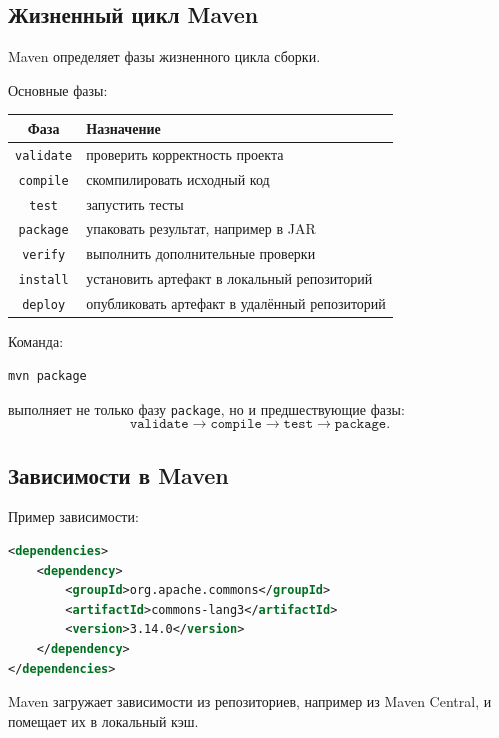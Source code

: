 \documentclass[12pt,a4paper]{article}
\begin{document}
\subsection{Жизненный цикл Maven}

Maven определяет фазы жизненного цикла сборки.

Основные фазы:
\begin{center}
\begin{tabular}{|c|p{9cm}|}
\hline
Фаза & Назначение \\
\hline
\texttt{validate} & проверить корректность проекта \\
\hline
\texttt{compile} & скомпилировать исходный код \\
\hline
\texttt{test} & запустить тесты \\
\hline
\texttt{package} & упаковать результат, например в JAR \\
\hline
\texttt{verify} & выполнить дополнительные проверки \\
\hline
\texttt{install} & установить артефакт в локальный репозиторий \\
\hline
\texttt{deploy} & опубликовать артефакт в удалённый репозиторий \\
\hline
\end{tabular}
\end{center}

Команда:

\begin{lstlisting}
mvn package
\end{lstlisting}

выполняет не только фазу \texttt{package}, но и предшествующие фазы:
\[
\texttt{validate} \rightarrow \texttt{compile} \rightarrow \texttt{test} \rightarrow \texttt{package}.
\]

\subsection{Зависимости в Maven}

Пример зависимости:

\begin{lstlisting}[language=XML]
<dependencies>
    <dependency>
        <groupId>org.apache.commons</groupId>
        <artifactId>commons-lang3</artifactId>
        <version>3.14.0</version>
    </dependency>
</dependencies>
\end{lstlisting}

Maven загружает зависимости из репозиториев, например из Maven Central, и помещает их в локальный кэш.
\end{document}
